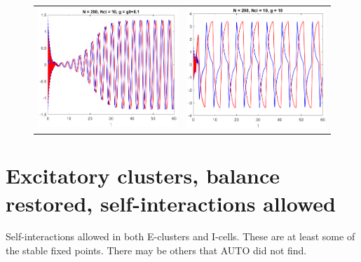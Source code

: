 \documentclass[11pt,reqno]{amsart}
\begin{document}
\begin{figure}[H]
\centering
\begin{tabular}{cc}
\includegraphics[width=8cm]{images/Iclustertimestep400_1.eps} &
\includegraphics[width=8cm]{images/Iclustertimestep400_2.eps}
\end{tabular}
\end{figure}

\section{Excitatory clusters, balance restored, self-interactions allowed}

Self-interactions allowed in both E-clusters and I-cells. These are at least some of the stable fixed points. There may be others that AUTO did not find.
\end{document}
